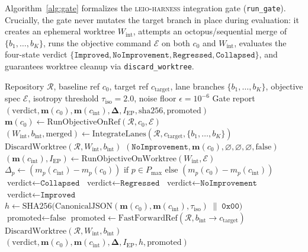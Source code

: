 \documentclass[11pt]{article}
\begin{document}
Algorithm~\ref{alg:gate} formalizes the \textsc{leio-harness} integration gate (\texttt{run\_gate}). Crucially, the gate never mutates the target branch in place during evaluation: it creates an ephemeral worktree $W_{\text{int}}$, attempts an octopus/sequential merge of $\{b_1, \dots, b_K\}$, runs the objective command $\mathcal{E}$ on both $c_0$ and $W_{\text{int}}$, evaluates the four-state verdict $\{\texttt{Improved}, \texttt{NoImprovement}, \texttt{Regressed}, \texttt{Collapsed}\}$, and guarantees worktree cleanup via \texttt{discard\_worktree}.

\begin{algorithm}[t]
\caption{Fail-Closed Multi-Agent Integration and Promotion Gate (\texttt{run\_gate})}
\label{alg:gate}
\begin{algorithmic}[1]
\Require Repository $\mathcal{R}$, baseline ref $c_0$, target ref $c_{\text{target}}$, lane branches $\{b_1, \dots, b_K\}$, objective spec $\mathcal{E}$, isotropy threshold $\tau_{\text{iso}} = 2.0$, noise floor $\epsilon = 10^{-6}$
\Ensure Gate report $(\text{verdict}, \mathbf{m}(c_0), \mathbf{m}(c_{\text{int}}), \boldsymbol{\Delta}, I_{\text{EP}}, \text{sha256}, \text{promoted})$
\State $\mathbf{m}(c_0) \gets \text{RunObjectiveOnRef}(\mathcal{R}, c_0, \mathcal{E})$
\State $(W_{\text{int}}, b_{\text{int}}, \text{merged}) \gets \text{IntegrateLanes}(\mathcal{R}, c_{\text{target}}, \{b_1, \dots, b_K\})$
 
    \State $\text{DiscardWorktree}(\mathcal{R}, W_{\text{int}}, b_{\text{int}})$
    \State \Return $(\texttt{NoImprovement}, \mathbf{m}(c_0), \varnothing, \varnothing, \varnothing, \text{false})$
\EndIf
\State $(\mathbf{m}(c_{\text{int}}), I_{\text{EP}}) \gets \text{RunObjectiveOnWorktree}(W_{\text{int}}, \mathcal{E})$
    \State $\Delta_p \gets (m_p(c_{\text{int}}) - m_p(c_0)) \text{ if } p \in P_{\max} \text{ else } (m_p(c_0) - m_p(c_{\text{int}}))$
\EndFor
{}
    \State $\text{verdict} \gets \texttt{Collapsed}$
    \State $\text{verdict} \gets \texttt{Regressed}$
    \State $\text{verdict} \gets \texttt{NoImprovement}$
\Else
    \State $\text{verdict} \gets \texttt{Improved}$
\EndIf
\State $h \gets \text{SHA256}\bigl(\text{CanonicalJSON}(\mathbf{m}(c_0), \mathbf{m}(c_{\text{int}}), \tau_{\text{iso}}) \;\|\; \texttt{0x00}\bigr)$
\State $\text{promoted} \gets \text{false}$
    \State $\text{promoted} \gets \text{FastForwardRef}(\mathcal{R}, b_{\text{int}} \to c_{\text{target}})$
\EndIf
\State $\text{DiscardWorktree}(\mathcal{R}, W_{\text{int}}, b_{\text{int}})$
\State \Return $(\text{verdict}, \mathbf{m}(c_0), \mathbf{m}(c_{\text{int}}), \boldsymbol{\Delta}, I_{\text{EP}}, h, \text{promoted})$
\end{algorithmic}
\end{algorithm}
\end{document}

